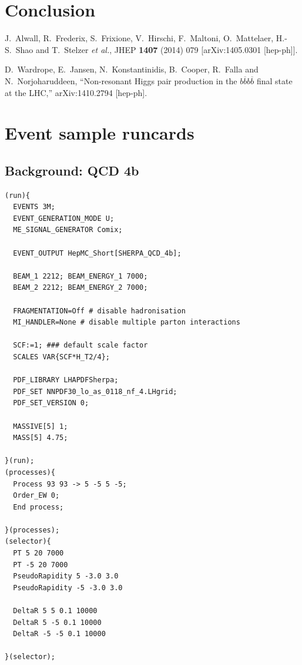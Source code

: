 \documentclass[12pt]{article}
\def\Acknowledgements{\bigskip  \bigskip \begin{center} \begin{large}
             \bf ACKNOWLEDGEMENTS \end{large}\end{center}}
\begin{document}
\section{Conclusion}





\begin{thebibliography}{1}

  J.~Alwall, R.~Frederix, S.~Frixione, V.~Hirschi, F.~Maltoni, O.~Mattelaer, H.-S.~Shao and T.~Stelzer {\it et al.},
  JHEP {\bf 1407} (2014) 079
  [arXiv:1405.0301 [hep-ph]].

  D.~Wardrope, E.~Jansen, N.~Konstantinidis, B.~Cooper, R.~Falla and N.~Norjoharuddeen,
  ``Non-resonant Higgs pair production in the $b\overline{b}b\overline{b}$ final state at the LHC,''
  arXiv:1410.2794 [hep-ph].


  \end{thebibliography}


\clearpage
\appendix
\section{Event sample runcards}
\label{app:runcards}
\subsection {Background: QCD 4b}
\begin{verbatim}
(run){
  EVENTS 3M;
  EVENT_GENERATION_MODE U;
  ME_SIGNAL_GENERATOR Comix;

  EVENT_OUTPUT HepMC_Short[SHERPA_QCD_4b];

  BEAM_1 2212; BEAM_ENERGY_1 7000;
  BEAM_2 2212; BEAM_ENERGY_2 7000;

  FRAGMENTATION=Off # disable hadronisation
  MI_HANDLER=None # disable multiple parton interactions

  SCF:=1; ### default scale factor
  SCALES VAR{SCF*H_T2/4};

  PDF_LIBRARY LHAPDFSherpa;
  PDF_SET NNPDF30_lo_as_0118_nf_4.LHgrid;
  PDF_SET_VERSION 0;

  MASSIVE[5] 1;
  MASS[5] 4.75;

}(run);
(processes){
  Process 93 93 -> 5 -5 5 -5;
  Order_EW 0;
  End process;

}(processes);
(selector){
  PT 5 20 7000
  PT -5 20 7000
  PseudoRapidity 5 -3.0 3.0
  PseudoRapidity -5 -3.0 3.0

  DeltaR 5 5 0.1 10000
  DeltaR 5 -5 0.1 10000
  DeltaR -5 -5 0.1 10000

}(selector);
\end{verbatim}
\end{document}
